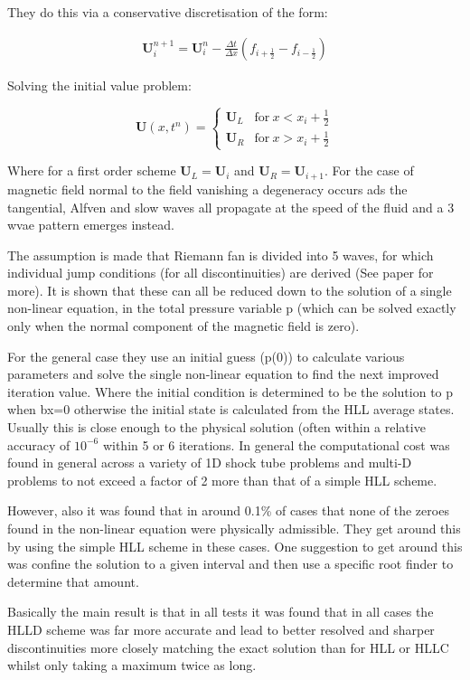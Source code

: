 \documentclass{article}
\begin{document}
They do this via a conservative discretisation of the form:

\begin{align}
    \mathbf{U}_i^{n+1}=\mathbf{U}_i^{n}-\frac{\Delta t}{ \Delta x}(f_{i+\frac{1}{2}}-f_{i-\frac{1}{2}})
\end{align}

Solving the initial value problem:

$$
\mathbf{U}(x,t^n)=\left\{\begin{array}{ll}
\mathbf{U}_L & \text{for} \ x<x_i+\frac{1}{2} \\
\mathbf{U}_R & \text{for} \ x>x_i+\frac{1}{2}
\end{array}\right.
$$

Where for a first order scheme $\mathbf{U}_L=\mathbf{U}_i$ and $\mathbf{U}_R=\mathbf{U}_{i+1}$. For the case of magnetic field normal to the field vanishing a degeneracy occurs ads the tangential, Alfven and slow waves all propagate at the speed of the fluid and a 3 wvae pattern emerges instead. 

The assumption is made that Riemann fan is divided into 5 waves, for which individual jump conditions (for all discontinuities) are derived (See paper for more). It is shown that these can all be reduced down to the solution of a single non-linear equation, in the total pressure variable p (which can be solved exactly only when the normal component of the magnetic field is zero). 

For the general case they use an initial guess (p(0)) to calculate various parameters and solve the single non-linear equation to find the next improved iteration value. Where the initial condition is determined to be the solution to p when bx=0 otherwise the initial state is calculated from the HLL average states. Usually this is close enough to the physical solution (often within a relative accuracy of $10^{-6}$ within 5 or 6 iterations. In general the computational cost was found in general across a variety of 1D shock tube problems and multi-D problems to not exceed a factor of 2 more than that of a simple HLL scheme. 

However, also it was found that in around 0.1\% of cases that none of the zeroes found in the non-linear equation were physically admissible. They get around this by using the simple HLL scheme in these cases. One suggestion to get around this was confine the solution to a given interval and then use a specific root finder to determine that amount. 

Basically the main result is that in all tests it was found that in all cases the HLLD scheme was far more accurate and lead to better resolved and sharper discontinuities more closely matching the exact solution than for HLL or HLLC whilst only taking a maximum twice as long. 
\end{document}
